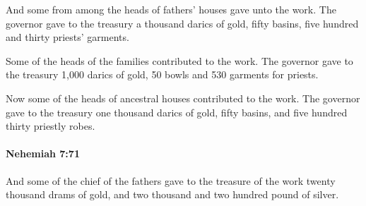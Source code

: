 			\begin{versebox}
					\item[BHS] 
					\item[LXX] 
					\item[ASV] And some from among the heads of fathers' houses gave unto the work. The governor gave to the treasury a thousand darics of gold, fifty basins, five hundred and thirty priests' garments.
					\item[NIV] Some of the heads of the families contributed to the work. The governor gave to the treasury 1,000 darics of gold, 50 bowls and 530 garments for priests.
					\item[NRSV] Now some of the heads of ancestral houses contributed to the work. The governor gave to the treasury one thousand darics of gold, fifty basins, and five hundred thirty priestly robes.
			\end{versebox}

		\paragraph{Nehemiah 7:71} %
			\label{NEHEMIAH-7-71}

			And some of the chief of the fathers gave to the treasure of the work twenty thousand drams of gold, and two thousand and two hundred pound of silver.

